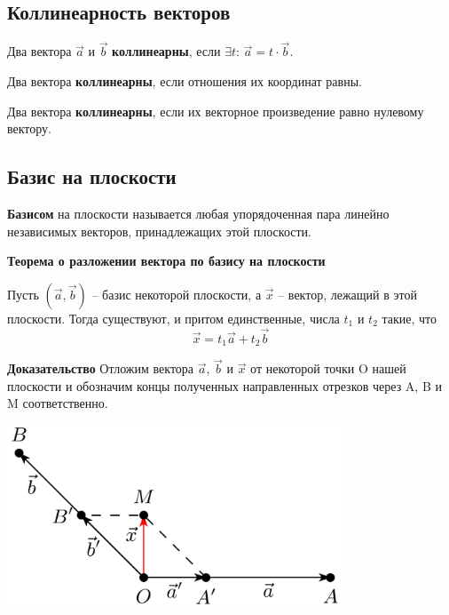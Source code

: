 \documentclass[a4paper]{article}
\begin{document}
\newpage \begin{center}\begin{Large}\end{Large}\end{center}
\subsection*{Коллинеарность векторов}
Два вектора $\vec{a}$ и $\vec{b}$ \textbf{коллинеарны}, если $\exists t$: $\vec{a} = t \cdot \vec{b}$.

Два вектора \textbf{коллинеарны}, если отношения их координат равны.

Два вектора \textbf{коллинеарны}, если их векторное произведение равно нулевому вектору.


\newpage \begin{center}\begin{Large}\end{Large}\end{center}
\subsection*{Базис на плоскости}
\textbf{Базисом} на плоскости называется любая упорядоченная пара линейно независимых векторов, принадлежащих этой плоскости. 


\begin{htheorem}
\textbf{Теорема о разложении вектора по базису на плоскости}

Пусть $(\vec{a},\vec{b})$ – базис некоторой плоскости, а $\vec{x}$ – вектор, лежащий в этой
плоскости. Тогда существуют, и притом единственные, числа $t_1$ и $t_2$ такие,
что
\begin{equation}
\vec{x} = t_1 \vec{a} + t_2 \vec{b}
\end{equation}

\end{htheorem}


\textbf{Доказательство}
Отложим вектора $\vec{a}$, $\vec{b}$ и $\vec{x}$ от некоторой точки O нашей
плоскости и обозначим концы полученных направленных отрезков через A, B и M соответственно.

\includegraphics[width=10cm]{t1}
\end{document}

